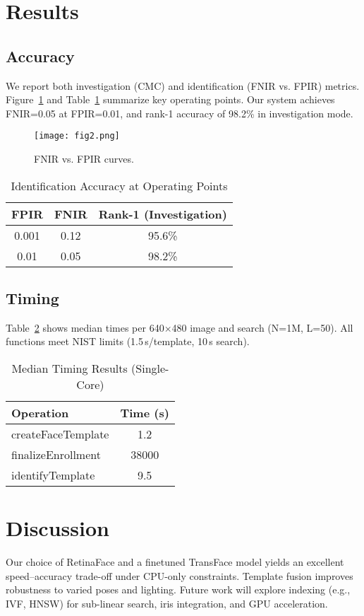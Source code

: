 \documentclass[conference]{IEEEtran}
\begin{document}
\section{Results}
\subsection{Accuracy}
We report both investigation (CMC) and identification (FNIR vs. FPIR) metrics. Figure~\ref{fig:fnir} and Table~\ref{tab:accuracy} summarize key operating points. Our system achieves FNIR=0.05 at FPIR=0.01, and rank-1 accuracy of 98.2\% in investigation mode.

\begin{figure}[htbp]
  \centering
  \texttt{[image: fig2.png]}
  \caption{FNIR vs. FPIR curves.}
  \label{fig:fnir}
\end{figure}

\begin{table}[htbp]
  \caption{Identification Accuracy at Operating Points}
  \label{tab:accuracy}
  \centering
  \begin{tabular}{|c|c|c|}
    \hline
    FPIR & FNIR & Rank-1 (Investigation) \\
    \hline
    0.001 & 0.12 & 95.6\% \\
    0.01  & 0.05 & 98.2\% \\
    \hline
  \end{tabular}
\end{table}

\subsection{Timing}
Table~\ref{tab:timing} shows median times per 640×480 image and search (N=1M, L=50). All functions meet NIST limits (1.5 s/template, 10 s search).

\begin{table}[htbp]
  \caption{Median Timing Results (Single-Core)}
  \label{tab:timing}
  \centering
  \begin{tabular}{|l|c|}
    \hline
    Operation & Time (s) \\
    \hline
    createFaceTemplate & 1.2 \\
    finalizeEnrollment & 38000 \\
    identifyTemplate   & 9.5  \\
    \hline
  \end{tabular}
\end{table}

\section{Discussion}
Our choice of RetinaFace and a finetuned TransFace model yields an excellent speed–accuracy trade-off under CPU-only constraints. Template fusion improves robustness to varied poses and lighting. Future work will explore indexing (e.g., IVF, HNSW) for sub-linear search, iris integration, and GPU acceleration.
\end{document}
